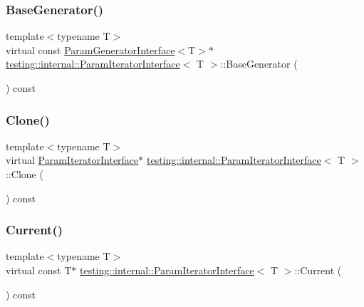 \subsubsection{\texorpdfstring{BaseGenerator()}{BaseGenerator()}}
{\footnotesize\ttfamily template$<$typename T$>$ \\
virtual const \mbox{\hyperlink{classtesting_1_1internal_1_1ParamGeneratorInterface}{Param\+Generator\+Interface}}$<$T$>$$\ast$ \mbox{\hyperlink{classtesting_1_1internal_1_1ParamIteratorInterface}{testing\+::internal\+::\+Param\+Iterator\+Interface}}$<$ T $>$\+::Base\+Generator (\begin{DoxyParamCaption}{ }\end{DoxyParamCaption}) const\hspace{0.3cm}{\ttfamily [pure virtual]}}

\mbox{\label{classtesting_1_1internal_1_1ParamIteratorInterface_a4998c23e27e2943d97546011aa35db80}} 
\subsubsection{\texorpdfstring{Clone()}{Clone()}}
{\footnotesize\ttfamily template$<$typename T$>$ \\
virtual \mbox{\hyperlink{classtesting_1_1internal_1_1ParamIteratorInterface}{Param\+Iterator\+Interface}}$\ast$ \mbox{\hyperlink{classtesting_1_1internal_1_1ParamIteratorInterface}{testing\+::internal\+::\+Param\+Iterator\+Interface}}$<$ T $>$\+::Clone (\begin{DoxyParamCaption}{ }\end{DoxyParamCaption}) const\hspace{0.3cm}{\ttfamily [pure virtual]}}

\mbox{\label{classtesting_1_1internal_1_1ParamIteratorInterface_adfff808576d929085679c315b255af7e}} 
\subsubsection{\texorpdfstring{Current()}{Current()}}
{\footnotesize\ttfamily template$<$typename T$>$ \\
virtual const T$\ast$ \mbox{\hyperlink{classtesting_1_1internal_1_1ParamIteratorInterface}{testing\+::internal\+::\+Param\+Iterator\+Interface}}$<$ T $>$\+::Current (\begin{DoxyParamCaption}{ }\end{DoxyParamCaption}) const\hspace{0.3cm}{\ttfamily [pure virtual]}}

